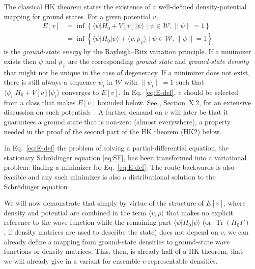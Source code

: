\documentclass[journal=apcach,manuscript=article,layout=twocolumn]{achemso}
\newcommand{\psispace}{\mathcal{W}}
\DeclareMathOperator{\trace}{Tr}
\newcommand{\changed}[1] {{ {#1}}} %
\begin{document}
The classical HK theorem \cite{Hohenberg1964} states the existence of a well-defined density-potential mapping for ground states.
For a given potential $v$,
\begin{equation}\label{eq:E-def}
\begin{aligned}
E[v] &= \inf\left\{ \langle \psi |H_0 + V[v]|\psi \rangle \mid \psi \in \psispace, \|\psi\|=1 \right\} \\
&= \inf\left\{ \langle \psi |H_0 | \psi \rangle + \langle v,\rho_\psi \rangle \mid \psi \in \psispace, \|\psi\|=1 \right\}
\end{aligned}
\end{equation}
is the \emph{ground-state energy} by the Rayleigh--Ritz variation principle. If a minimizer exists then $\psi$ and $\rho_\psi$ are the corresponding \emph{ground state} and \emph{ground-state density} that might not be unique in the case of degeneracy.
If a minimizer does not exist, there is still always a sequence $\psi_i$ in $\psispace$ with $\|\psi_i\|=1$ such that $\langle \psi_i |H_0 + V[v]|\psi_i \rangle$ converges to $E[v]$. 
In Eq.~\eqref{eq:E-def}, $v$ should be selected from a class that makes $E[v]$ bounded below. See \citeauthor{reed1975ii}, Section~X.2, for an extensive discussion on such potentials~\cite{reed1975ii}. A further demand on $v$ will later be that it guarantees a ground state that is non-zero (almost everywhere), a property needed in the proof of the second part of the HK theorem (HK2) below.

In Eq.~\eqref{eq:E-def} the problem of solving a partial-differential equation, the stationary Schr\"odinger equation \eqref{eq:SE}, has been transformed into a variational problem: finding a minimizer for Eq.~\eqref{eq:E-def}. The route backwards is also feasible and any such minimizer is also a distributional solution to the Schr\"odinger equation \cite[Theorem~11.8]{LiebLoss}. %

We will now demonstrate that simply by virtue of the structure of $E[v]$, where density and potential are combined in the term $\langle v,\rho \rangle$ that makes no explicit reference to the wave function while the remaining part $\langle \psi |H_0 |\psi \rangle$ (or $\trace(H_0\Gamma)$, if density matrices are used to describe the state) does not depend on $v$, we can already define a mapping from ground-state densities to ground-state wave functions or density matrices. This, then, is already half of a \changed{HK} theorem, that we will already give in a variant for ensemble $v$-representable densities.
\end{document}
